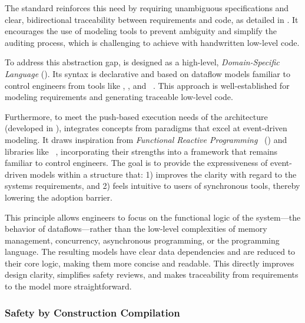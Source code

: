 The \iso standard reinforces this need by requiring unambiguous specifications and clear,
bidirectional traceability between requirements and code, as detailed in
. It encourages the use of modeling tools to prevent
ambiguity and simplify the auditing process, which is challenging to achieve with handwritten
low-level code.

To address this abstraction gap, \GRust is designed as a high-level, \emph{Domain-Specific Language}
(\dsl). Its syntax is declarative and based on dataflow models familiar to control engineers from
tools like \Simulink, \Scade, and
\Lustre~\cite{DBLP:conf/popl/CaspiPHP87,DBLP:conf/tase/ColacoPP17}. This approach is
well-established for modeling requirements and generating traceable low-level code.

Furthermore, to meet the push-based execution needs of the \sdv architecture
(developed in ), \GRust integrates concepts from paradigms
that excel at event-driven modeling. It draws inspiration from
\emph{Functional Reactive Programming}~\cite{DBLP:conf/icfp/ElliottH97} (\frp) and libraries like
\ReactiveX~\cite{reactivex}, incorporating their strengths into a framework that remains familiar to
control engineers. The goal is to provide the expressiveness of event-driven models within a
structure that:
1) improves the clarity with regard to the systems requirements, and
2) feels intuitive to users of synchronous tools, thereby lowering the adoption barrier.

This principle allows engineers to focus on the functional logic of the system---\ie the behavior of
dataflows---rather than the low-level complexities of memory management, concurrency, asynchronous
programming, or the \Rust programming language. The resulting models have clear data dependencies
and are reduced to their core logic, making them more concise and readable. This directly improves
design clarity, simplifies safety reviews, and makes traceability from requirements to the model
more straightforward.

\subsubsection{Safety by Construction \via \Rust Compilation}
\label{sec:grust:implem:design_principles:safety_rust}

